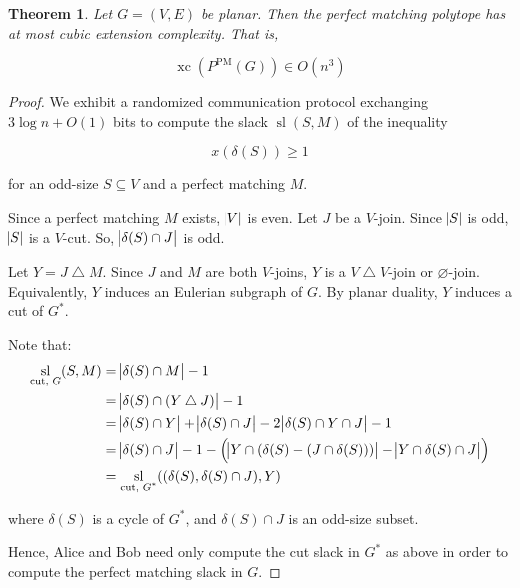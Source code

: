 \documentclass{article}
\newtheorem{theorem}{Theorem}
\DeclareMathOperator{\xc}{xc}
\DeclareMathOperator{\Sl}{sl}
\begin{document}
\begin{theorem}
	Let $G=(V,E)$ be planar. Then the perfect matching polytope has
	at most cubic extension complexity. That is,

	$$\xc(P^{\text{PM}}(G)) \in O(n^3)$$
\end{theorem}
\begin{proof}
	We exhibit a randomized communication protocol exchanging $3\log n+O(1)$
	bits to compute the slack $\Sl(S, M)$ of the inequality
	
	$$ x(\delta(S)) \geq 1$$

	for an odd-size $S\subseteq V$ and a perfect matching $M$.

	Since a perfect matching $M$ exists, $\abs{V}$ is even.
	Let $J$ be a $V$-join. Since $\abs{S}$ is odd, 
	$\abs{S}$ is a $V$-cut. 
	So, $\abs{\delta(S)\cap J}$ is odd.

	Let $Y = J\bigtriangleup M$. Since $J$ and $M$ are both $V$-joins,
	$Y$ is a $V\bigtriangleup V$-join or $\varnothing$-join.
	Equivalently, $Y$ induces an Eulerian subgraph of $G$.
	By planar duality, $Y$ induces a cut of $G^*$.

	Note that:
	\begin{align*}
		\Sl_\text{cut, $G$}(S, M) &= \abs{\delta(S)\cap M} - 1 \\
		&= \abs{\delta(S)\cap (Y \bigtriangleup J)} - 1 \\
		&= \abs{\delta(S)\cap Y} + \abs{\delta(S)\cap J} - 2\abs{\delta(S)\cap Y \cap J} - 1 \\
		&= \abs{\delta(S)\cap J} - 1 - \del{\abs{Y\cap(\delta(S)-(J\cap\delta(S)))} - \abs{Y\cap\delta(S)\cap J}} \\
		&= \Sl_\text{cut, $G^*$}((\delta(S), \delta(S)\cap J), Y) 
	\end{align*}

	where $\delta(S)$ is a cycle of $G^*$,
	and $\delta(S)\cap J$ is an odd-size subset.

	Hence, Alice and Bob need only compute the cut slack in $G^*$ as above
	in order to compute the perfect matching slack in $G$.
\end{proof}
\end{document}
